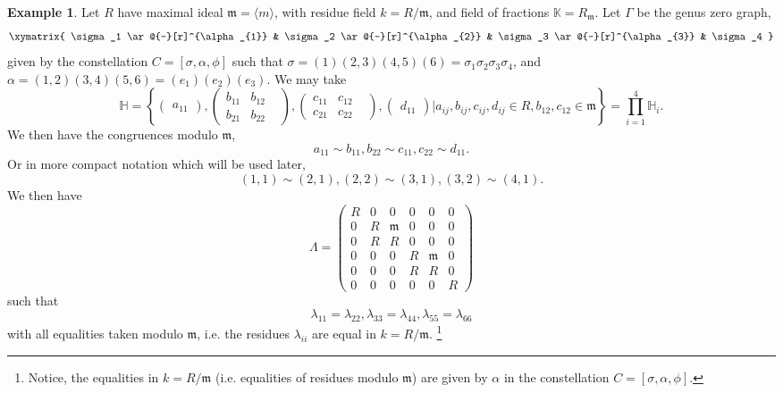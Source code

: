 \documentclass[11pt,oneside]{amsbook}
\numberwithin{equation}{section}
\theoremstyle{plain}
\theoremstyle{definition}
\newtheorem{ex}[theorem]{Example}
\theoremstyle{remark}
\newcommand{\sidenote}[1]{\footnote{#1}}
\newcommand{\KK}{\mathbb{K}}
\newcommand{\HH}{\mathbb{H}}
\newcommand{\la}{\langle}
\newcommand{\ra}{\rangle}
\begin{document}
	\begin{ex}
		Let $R$ have maximal ideal $\mathfrak{m} = \la m \ra$, with residue field $k=R/\mathfrak{m}$, and field of fractions $\KK=R_{\mathfrak{m}}$. 
		Let $\Gamma$ be the genus zero graph,  
		\[
		\xymatrix{
			\sigma_1 \ar@{-}[r]^{\alpha_{1}} & \sigma_2 \ar@{-}[r]^{\alpha_{2}} & \sigma_3 \ar@{-}[r]^{\alpha_{3}} & \sigma_4
		}
		\]
		given by the constellation $C=[\sigma, \alpha, \phi]$ such that 
		$\sigma = (1)(2,3)(4,5)(6) = \sigma_1 \sigma_2 \sigma_3 \sigma_4$, and $\alpha = (1,2)(3,4)(5,6) = (e_1)(e_2)(e_3)$. We may take 
		\[ \HH = \left\lbrace \begin{pmatrix}
			a_{11} 
		\end{pmatrix}, \begin{pmatrix}
			b_{11} & b_{12} & \\
			b_{21} & b_{22} & 
		\end{pmatrix}, \begin{pmatrix}
			c_{11} & c_{12} & \\
			c_{21} & c_{22} & 
		\end{pmatrix}, \begin{pmatrix}
			d_{11} 
		\end{pmatrix}\Bigg| a_{ij}, b_{ij}, c_{ij}, d_{ij}  \in R, b_{12}, c_{12} \in \mathfrak{m} \right\rbrace = \prod_{i=1}^4 \HH_i. \]
		We then have the congruences modulo $\mathfrak{m}$, 
		\[ a_{11} \sim b_{11}, b_{22} \sim c_{11}, c_{22} \sim d_{11}. \]
		Or in more compact notation which will be used later, 
		\[ (1,1) \sim (2,1), (2,2) \sim (3,1), (3,2) \sim (4,1). \]
		We then have 
		\[ \Lambda = \begin{pmatrix}
			R & 0 & 0 & 0 & 0 & 0\\
			0 & R & \mathfrak{m} & 0 & 0 & 0\\
			0 & R & R & 0 & 0 & 0\\
			0 & 0 & 0 & R & \mathfrak{m} & 0\\
			0 & 0 & 0 & R & R & 0\\
			0 & 0 & 0 & 0 & 0 & R 
		\end{pmatrix} \]
		such that \[\lambda_{11} = \lambda_{22}, \lambda_{33} = \lambda_{44}, \lambda_{55} = \lambda_{66}\]
		with all equalities taken modulo $\mathfrak{m}$, i.e. the residues $\lambda_{ii}$ are equal in $k=R/\mathfrak{m}$. \sidenote{Notice, the equalities in $k=R/\mathfrak{m}$ (i.e. equalities of residues modulo $\mathfrak{m}$) are given by $\alpha$ in the constellation $C = [\sigma, \alpha, \phi]$.}
		

\end{ex}
\end{document}
